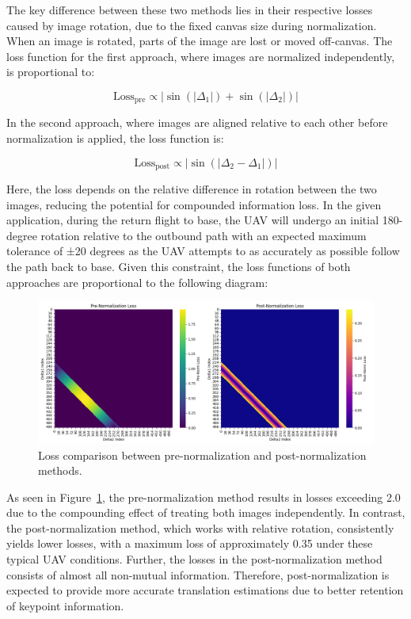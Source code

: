 \begin{enumerate}
The key difference between these two methods lies in their respective losses caused by image rotation, due to the fixed canvas size during normalization. When an image is rotated, parts of the image are lost or moved off-canvas. 
The loss function for the first approach, where images are normalized independently, is proportional to:

\begin{equation}
\text{Loss}_{\text{pre}} \propto |\sin(|\Delta_1|) + \sin(|\Delta_2|)|
\end{equation}

In the second approach, where images are aligned relative to each other before normalization is applied, the loss function is:

\begin{equation}
\text{Loss}_{\text{post}} \propto |\sin(|\Delta_2 - \Delta_1|)|
\end{equation}


Here, the loss depends on the relative difference in rotation between the two images, reducing the potential for compounded information loss. In the given application, during the return flight to base, the UAV will undergo an initial 180-degree rotation relative to the outbound path with an expected maximum tolerance of ±20 degrees as the UAV attempts to as accurately as possible follow the path back to base. Given this constraint, the loss functions of both approaches are proportional to the following diagram:

\begin{figure}[H]
    \centering
    \includegraphics[width=\textwidth]{Chapter 4/Figs4/lossprevspost.png}
    \caption{Loss comparison between pre-normalization and post-normalization methods.}
    \label{fig:lossprevpost}
\end{figure}


As seen in Figure~\ref{fig:lossprevpost}, the pre-normalization method results in losses exceeding 2.0 due to the compounding effect of treating both images independently. In contrast, the post-normalization method, which works with relative rotation, consistently yields lower losses, with a maximum loss of approximately 0.35 under these typical UAV conditions. Further, the losses in the post-normalization method consists of almost all non-mutual information. Therefore, post-normalization is expected to provide more accurate translation estimations due to better retention of keypoint information.



\end{enumerate}
